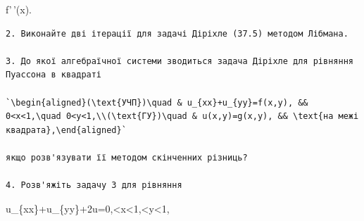 \documentclass[
  ukrainian,
]{article}
\begin{document}
f'\,'(x)\approx {}.

\begin{verbatim}
2. Виконайте дві ітерації для задачі Діріхле (37.5) методом Лібмана.

3. До якої алгебраїчної системи зводиться задача Діріхле для рівняння Пуассона в квадраті

`\begin{aligned}(\text{УЧП})\quad & u_{xx}+u_{yy}=f(x,y), && 0<x<1,\quad 0<y<1,\\(\text{ГУ})\quad & u(x,y)=g(x,y), && \text{на межі квадрата},\end{aligned}`

якщо розв'язувати її методом скінченних різниць?

4. Розв'яжіть задачу 3 для рівняння
\end{verbatim}

u\_\{xx\}+u\_\{yy\}+2u=0,\textless x\textless1,\textless y\textless1,
\end{document}
